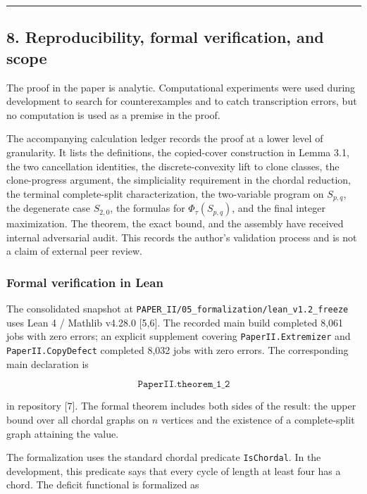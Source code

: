 \documentclass[
  american,
  11pt,
  a4paper,
]{article}
\begin{document}
\begin{center}\rule{0.5\linewidth}{0.5pt}\end{center}

\subsection{8. Reproducibility, formal verification, and scope}\label{reproducibility-formal-verification-and-scope}

The proof in the paper is analytic. Computational experiments were used during development to search for counterexamples and to catch transcription errors, but no computation is used as a premise in the proof.

The accompanying calculation ledger records the proof at a lower level of granularity. It lists the definitions, the copied-cover construction in Lemma 3.1, the two cancellation identities, the discrete-convexity lift to clone classes, the clone-progress argument, the simpliciality requirement in the chordal reduction, the terminal complete-split characterization, the two-variable program on \(S_{p,q}\), the degenerate case \(S_{2,0}\), the formulas for \(\Phi_\tau(S_{p,q})\), and the final integer maximization. The theorem, the exact bound, and the assembly have received internal adversarial audit. This records the author's validation process and is not a claim of external peer review.

\subsubsection{Formal verification in Lean}\label{formal-verification-in-lean}

The consolidated snapshot at \texttt{PAPER\_II/05\_formalization/lean\_v1.2\_freeze} uses Lean 4 / Mathlib v4.28.0 {[}5,6{]}. The recorded main build completed 8,061 jobs with zero errors; an explicit supplement covering \texttt{PaperII.Extremizer} and \texttt{PaperII.CopyDefect} completed 8,032 jobs with zero errors. The corresponding main declaration is

\[
\texttt{PaperII.theorem\_1\_2}
\]

in repository {[}7{]}. The formal theorem includes both sides of the result: the upper bound over all chordal graphs on \(n\) vertices and the existence of a complete-split graph attaining the value.

The formalization uses the standard chordal predicate \texttt{IsChordal}. In the development, this predicate says that every cycle of length at least four has a chord. The deficit functional is formalized as
\end{document}
